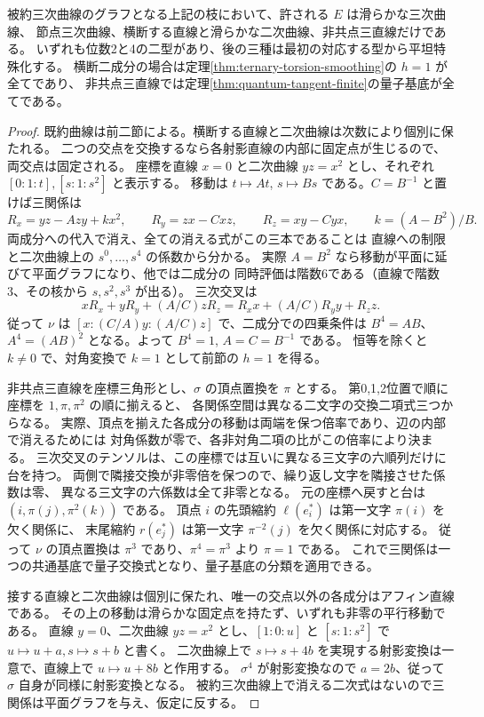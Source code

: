 \begin{theorem}\label{thm:reduced-ternary-graphs}
被約三次曲線のグラフとなる上記の枝において、許される $E$ は滑らかな三次曲線、
節点三次曲線、横断する直線と滑らかな二次曲線、非共点三直線だけである。
いずれも位数2と4の二型があり、後の三種は最初の対応する型から平坦特殊化する。
横断二成分の場合は定理\ref{thm:ternary-torsion-smoothing}の $h=1$ が全てであり、
非共点三直線では定理\ref{thm:quantum-tangent-finite}の量子基底が全てである。
\end{theorem}
\begin{proof}
既約曲線は前二節による。横断する直線と二次曲線は次数により個別に保たれる。
二つの交点を交換するなら各射影直線の内部に固定点が生じるので、両交点は固定される。
座標を直線 $x=0$ と二次曲線 $yz=x^2$ とし、それぞれ $[0:1:t],[s:1:s^2]$ と表示する。
移動は $t\mapsto At$, $s\mapsto Bs$ である。$C=B^{-1}$ と置けば三関係は
\[
 R_x=yz-Azy+k x^2,\qquad R_y=zx-Cxz,\qquad R_z=xy-Cyx,\qquad k=(A-B^2)/B .
\]
両成分への代入で消え、全ての消える式がこの三本であることは
直線への制限と二次曲線上の $s^0,\ldots,s^4$ の係数から分かる。
実際 $A=B^2$ なら移動が平面に延びて平面グラフになり、他では二成分の
同時評価は階数6である（直線で階数3、その核から $s,s^2,s^3$ が出る）。
三次交叉は
\[
 xR_x+yR_y+(A/C)zR_z=R_xx+(A/C)R_yy+R_zz .
\]
従って $\nu$ は $[x:(C/A)y:(A/C)z]$ で、二成分での四乗条件は
$B^4=A B$、$A^4=(A B)^2$ となる。よって $B^4=1$, $A=C=B^{-1}$ である。
恒等を除くと $k\ne0$ で、対角変換で $k=1$ として前節の $h=1$ を得る。

非共点三直線を座標三角形とし、$\sigma$ の頂点置換を $\pi$ とする。
第0,1,2位置で順に座標を $1,\pi,\pi^2$ の順に揃えると、
各関係空間は異なる二文字の交換二項式三つからなる。
実際、頂点を揃えた各成分の移動は両端を保つ倍率であり、辺の内部で消えるためには
対角係数が零で、各非対角二項の比がこの倍率により決まる。
三次交叉のテンソルは、この座標では互いに異なる三文字の六順列だけに台を持つ。
両側で隣接交換が非零倍を保つので、繰り返し文字を隣接させた係数は零、
異なる三文字の六係数は全て非零となる。
元の座標へ戻すと台は $(i,\pi(j),\pi^2(k))$ である。
頂点 $i$ の先頭縮約 $\ell(e_i^*)$ は第一文字 $\pi(i)$ を欠く関係に、
末尾縮約 $r(e_j^*)$ は第一文字 $\pi^{-2}(j)$ を欠く関係に対応する。
従って $\nu$ の頂点置換は $\pi^3$ であり、$\pi^4=\pi^3$ より $\pi=1$ である。
これで三関係は一つの共通基底で量子交換式となり、量子基底の分類を適用できる。

接する直線と二次曲線は個別に保たれ、唯一の交点以外の各成分はアフィン直線である。
その上の移動は滑らかな固定点を持たず、いずれも非零の平行移動である。
直線 $y=0$、二次曲線 $yz=x^2$ とし、$[1:0:u]$ と $[s:1:s^2]$ で
$u\mapsto u+a,s\mapsto s+b$ と書く。
二次曲線上で $s\mapsto s+4b$ を実現する射影変換は一意で、直線上で $u\mapsto u+8b$ と作用する。
$\sigma^4$ が射影変換なので $a=2b$、従って $\sigma$ 自身が同様に射影変換となる。
被約三次曲線上で消える二次式はないので三関係は平面グラフを与え、仮定に反する。


\end{proof}
